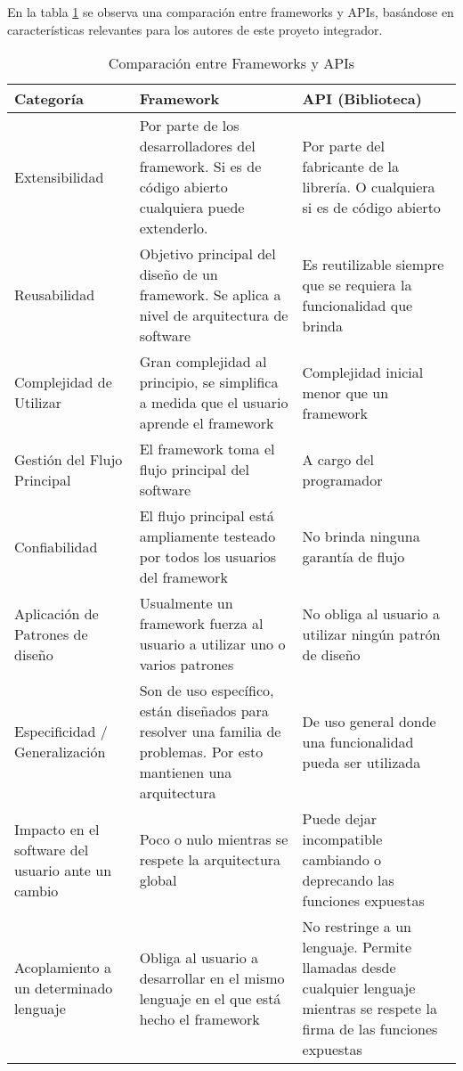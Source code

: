 En la tabla \ref {tab:comparacion_frameworks_apis} se observa una comparación
entre frameworks y APIs, basándose en características relevantes para los
autores de este proyeto integrador.
\begin{table}
	\renewcommand{\arraystretch}{1.5}
	\centering
	\begin{tabularx}{\textwidth}{ | p{2cm} | X | X | }
	\hline
	Categoría & Framework & API (Biblioteca) \\[10pt] \hline
	Extensibilidad & Por parte de los desarrolladores del framework. Si es de
	código abierto cualquiera puede extenderlo. & Por parte del fabricante de la
	librería.
	O cualquiera si es de código abierto \\[10pt] \hline
	Reusabilidad & Objetivo principal del diseño de un framework.
	Se aplica a nivel de arquitectura de software & Es reutilizable siempre que se
	requiera la funcionalidad que brinda\\[10pt] \hline
	Complejidad de Utilizar & Gran complejidad al principio, se simplifica a medida
	que el usuario aprende el framework & Complejidad inicial menor que un
	framework\\[10pt] \hline 
	Gestión del Flujo Principal & El framework toma el
	flujo principal del software & A cargo del programador\\[10pt] \hline
	Confiabilidad & El flujo principal está ampliamente testeado por todos los
	usuarios del framework & No brinda ninguna garantía de flujo\\[10pt] \hline
	Aplicación de Patrones de diseño & Usualmente un framework fuerza al usuario a
	utilizar uno o varios patrones & No obliga al usuario a utilizar ningún patrón
	de diseño\\[10pt] \hline 
	Especificidad / Generalización & Son de uso específico,
	están diseñados para resolver una familia de problemas. Por esto mantienen una
	arquitectura & De uso general donde una funcionalidad pueda ser
	utilizada\\[10pt] \hline 
	Impacto en el software del usuario ante un cambio &
	Poco o nulo mientras se respete la arquitectura global & Puede dejar
	incompatible cambiando o deprecando las funciones expuestas\\[10pt] \hline
	Acoplamiento a un determinado lenguaje & Obliga al usuario a desarrollar en el
	mismo lenguaje en el que está hecho el framework & No restringe a un lenguaje.
	Permite llamadas desde cualquier lenguaje mientras se respete la firma de las funciones expuestas\\[10pt] 
	\hline
	\end{tabularx}
	\caption{Comparación entre Frameworks y APIs}
	\label{tab:comparacion_frameworks_apis}
\end{table}

